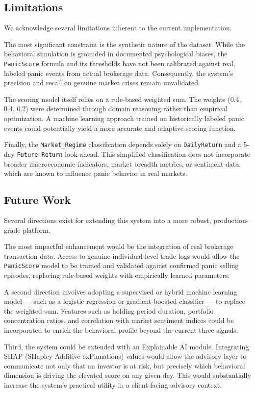 \subsection{Limitations}
We acknowledge several limitations inherent to the current implementation.

The most significant constraint is the synthetic nature of the dataset. While the behavioral simulation is grounded in documented psychological biases, the \texttt{PanicScore} formula and its thresholds have not been calibrated against real, labeled panic events from actual brokerage data. Consequently, the system's precision and recall on genuine market crises remain unvalidated.

The scoring model itself relies on a rule-based weighted sum. The weights (0.4, 0.4, 0.2) were determined through domain reasoning rather than empirical optimization. A machine learning approach trained on historically labeled panic events could potentially yield a more accurate and adaptive scoring function.

Finally, the \texttt{Market\_Regime} classification depends solely on \texttt{DailyReturn} and a 5-day \texttt{Future\_Return} look-ahead. This simplified classification does not incorporate broader macroeconomic indicators, market breadth metrics, or sentiment data, which are known to influence panic behavior in real markets.

\subsection{Future Work}
Several directions exist for extending this system into a more robust, production-grade platform.

The most impactful enhancement would be the integration of real brokerage transaction data. Access to genuine individual-level trade logs would allow the \texttt{PanicScore} model to be trained and validated against confirmed panic selling episodes, replacing rule-based weights with empirically learned parameters.

A second direction involves adopting a supervised or hybrid machine learning model — such as a logistic regression or gradient-boosted classifier — to replace the weighted sum. Features such as holding period duration, portfolio concentration ratios, and correlation with market sentiment indices could be incorporated to enrich the behavioral profile beyond the current three signals.

Third, the system could be extended with an Explainable AI module. Integrating SHAP (SHapley Additive exPlanations) values would allow the advisory layer to communicate not only that an investor is at risk, but precisely which behavioral dimension is driving the elevated score on any given day. This would substantially increase the system's practical utility in a client-facing advisory context.

